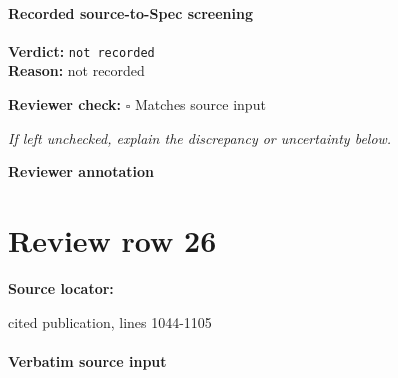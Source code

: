 \documentclass[10pt]{article}
\newcommand{\reviewerbox}{%
  \par\noindent\fbox{\parbox{0.96\linewidth}{\rule{0pt}{0.38in}}}\par
}
\newcommand{\reviewmatch}[1]{%
  \par\noindent\textbf{Reviewer check:} $\square$\; #1\par
  \noindent\emph{If left unchecked, explain the discrepancy or uncertainty below.}\par
}
\begin{document}
\paragraph{Recorded source-to-Spec screening}
\textbf{Verdict:} \texttt{not recorded}
\\
\textbf{Reason:} not recorded
\reviewmatch{Matches source input}
\noindent\textbf{Reviewer annotation}\par
\reviewerbox
\clearpage
\hypertarget{source-claim-a3b878a82854afb8}{}
\section*{Review row 26}
\textbf{Source locator:} {\footnotesize\raggedright cited publication, lines 1044-\allowbreak{}1105\par}
\paragraph{Verbatim source input}
\end{document}
